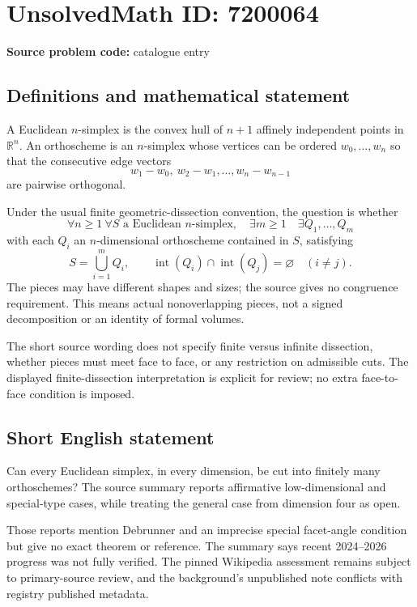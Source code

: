 \documentclass[11pt]{article}
\newcommand{\R}{\mathbb{R}}
\begin{document}
\section*{UnsolvedMath ID: 7200064}
\textbf{Source problem code:} catalogue entry
\subsection{Definitions and mathematical statement}
A Euclidean $n$-simplex is the convex hull of $n+1$ affinely independent points in $\R^n$. An orthoscheme is an $n$-simplex whose vertices can be ordered $w_0,\ldots,w_n$ so that the consecutive edge vectors
\[
 w_1-w_0,\ w_2-w_1,\ldots,w_n-w_{n-1}
\]
are pairwise orthogonal.

Under the usual finite geometric-dissection convention, the question is whether
\[
 \forall n\ge1\ \forall S\text{ a Euclidean }n\text{-simplex},
 \quad\exists m\ge1\quad\exists Q_1,\ldots,Q_m
\]
with each $Q_i$ an $n$-dimensional orthoscheme contained in $S$, satisfying
\[
 S=\bigcup_{i=1}^m Q_i,\qquad
 \operatorname{int}(Q_i)\cap\operatorname{int}(Q_j)=\varnothing
 \quad(i\ne j).
\]
The pieces may have different shapes and sizes; the source gives no congruence requirement. This means actual nonoverlapping pieces, not a signed decomposition or an identity of formal volumes.

The short source wording does not specify finite versus infinite dissection, whether pieces must meet face to face, or any restriction on admissible cuts. The displayed finite-dissection interpretation is explicit for review; no extra face-to-face condition is imposed.
\subsection{Short English statement}
Can every Euclidean simplex, in every dimension, be cut into finitely many orthoschemes? The source summary reports affirmative low-dimensional and special-type cases, while treating the general case from dimension four as open.

Those reports mention Debrunner and an imprecise special facet-angle condition but give no exact theorem or reference. The summary says recent 2024--2026 progress was not fully verified. The pinned Wikipedia assessment remains subject to primary-source review, and the background's unpublished note conflicts with registry published metadata.
\end{document}

